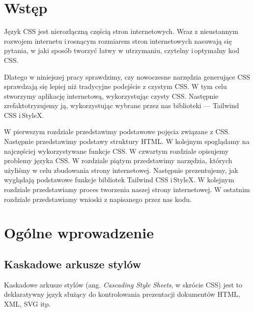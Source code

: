 \documentclass[a4paper,12pt]{book} %
\renewcommand{\chaptermark}[1]{\markboth{#1}{}}
\begin{document}
\sloppy



\thispagestyle{empty}


\newpage{}

\thispagestyle{empty}

\newpage{}



\tableofcontents{}






\chapter*{Wstęp} %
\chaptermark{Wstęp} %

Język CSS jest nierozłączną częścią stron internetowych. Wraz z nieustannym rozwojem internetu i\,rosnącym rozmiarem stron internetowych nasuwają się pytania, w jaki sposób tworzyć łatwy w utrzymaniu, czytelny i\,optymalny kod CSS.

Dlatego w niniejszej pracy sprawdzimy, czy nowoczesne narzędzia generujące CSS sprawdzają się lepiej niż tradycyjne podejście z czystym CSS. W tym celu stworzymy aplikację internetową, wykorzystując czysty CSS. Następnie zrefaktotryzujemy ją, wykorzystując wybrane przez nas biblioteki --- Tailwind CSS i\,StyleX.

W pierwszym rozdziale przedstawimy podstawowe pojęcia związane z CSS. Następnie przedstawimy podstawy struktury HTML. W kolejnym spoglądamy na najczęściej wykorzystywane funkcje CSS. W czwartym rozdziale opisujemy problemy języka CSS. W rozdziale piątym przedstawimy narzędzia, których użyliśmy w celu zbudowania strony internetowej. Następnie prezentujemy, jak wyglądają podstawowe funkcje bibliotek Tailwind CSS i\,StyleX. W kolejnym rozdziale przedstawiamy proces tworzenia naszej strony internetowej. W ostatnim rozdziale przedstawiamy wnioski z napisanego przez nas kodu.



\chapter{Ogólne wprowadzenie}
\section{Kaskadowe arkusze stylów}
Kaskadowe arkusze stylów (ang. \emph{Cascading Style Sheets}, w skrócie CSS) jest to deklaratywny język służący do kontrolowania prezentacji dokumentów HTML, XML, SVG itp.
\end{document}
